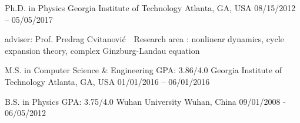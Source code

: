 


\begin{cventries}

\cveducation
{Ph.D. in Physics}
{}
{Georgia Institute of Technology}
{Atlanta, GA, USA}
{08/15/2012 -- 05/05/2017}
{
  \begin{cvitems}
    \item adviser: Prof. Predrag Cvitanovi\'c \quad \quad 
    \bullet \,\, Research area : nonlinear dynamics, cycle expansion theory,
      complex Ginzburg-Landau equation
  \end{cvitems}
}


\cveducation
{M.S. in Computer Science \& Engineering }
{GPA: 3.86/4.0}
{Georgia Institute of Technology}
{Atlanta, GA, USA}
{01/01/2016 -- 06/01/2016}
{
}
\vspace{-0.5em}

\cveducation
{B.S. in Physics} %
{GPA: 3.75/4.0}
{Wuhan University} %
{Wuhan, China} %
{09/01/2008 - 06/05/2012}
{    
}
\vspace{-0.5em}



\end{cventries}
